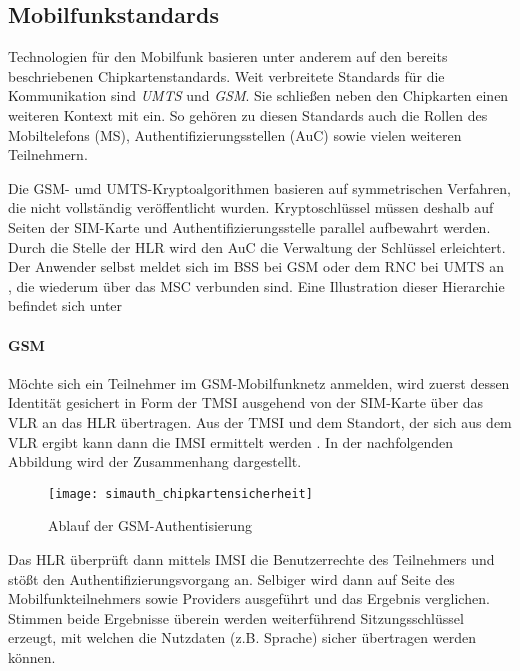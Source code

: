 \subsection{Mobilfunkstandards} %
Technologien für den Mobilfunk basieren unter anderem auf den bereits beschriebenen
Chipkartenstandards. Weit verbreitete Standards für die Kommunikation sind
\textit{UMTS} und \textit{GSM}. Sie schließen neben den Chipkarten einen weiteren
Kontext mit ein. So gehören zu diesen Standards auch die Rollen des Mobiltelefons (\ac{MS}),
Authentifizierungsstellen (\ac{AuC}) sowie vielen weiteren Teilnehmern.

Die GSM- umd UMTS-Kryptoalgorithmen basieren auf symmetrischen Verfahren, die nicht
vollständig veröffentlicht wurden. Kryptoschlüssel müssen deshalb auf
Seiten der SIM-Karte und Authentifizierungsstelle parallel aufbewahrt werden.
Durch die Stelle der \ac{HLR} wird den \ac{AuC} die Verwaltung der Schlüssel erleichtert.
Der Anwender selbst meldet sich im \ac{BSS} bei GSM oder dem \ac{RNC} bei UMTS an \cite{spitz11},
die wiederum über das \ac{MSC} verbunden sind. Eine Illustration dieser Hierarchie
befindet sich unter 

\paragraph{GSM}
Möchte sich ein Teilnehmer im GSM-Mobilfunknetz anmelden, wird zuerst dessen Identität
gesichert in Form der \ac{TMSI} ausgehend von der SIM-Karte über das \ac{VLR} an das
\ac{HLR} übertragen. Aus der \ac{TMSI} und dem Standort, der sich aus dem \ac{VLR}
ergibt kann dann die \ac{IMSI} ermittelt werden \cite{spitz11}. In der
nachfolgenden Abbildung wird der Zusammenhang dargestellt.

\begin{figure}[htp]
 \begin{center}
  \texttt{[image: simauth\_chipkartensicherheit]}
 \end{center}
 \caption[Ablauf der GSM-Authentisierung]{Ablauf der GSM-Authentisierung \cite{spitz11}}
 \label{abb:simauth}
\end{figure}

Das \ac{HLR} überprüft dann mittels \ac{IMSI} die Benutzerrechte des Teilnehmers und
stößt den Authentifizierungsvorgang an. Selbiger wird dann auf Seite des
Mobilfunkteilnehmers sowie Providers ausgeführt und das Ergebnis verglichen.
Stimmen beide Ergebnisse überein werden weiterführend Sitzungsschlüssel erzeugt,
mit welchen die Nutzdaten (z.B. Sprache) sicher übertragen werden können.

